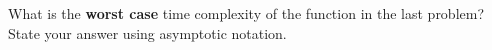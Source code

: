 \begin{prob}
    What is the \textbf{worst case} time complexity of the function in the last problem?
    State your answer using asymptotic notation.


\end{prob}
